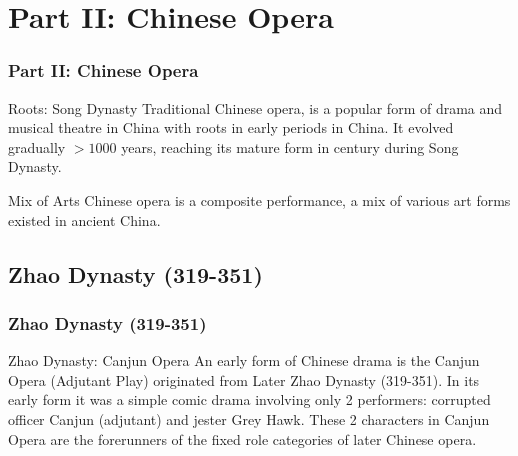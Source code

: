 \documentclass[pdflatex,compress,8pt,
	xcolor={dvipsnames,dvipsnames,svgnames,x11names,table},
	hyperref={	
	breaklinks = true, 
	pdfauthor={Lemenkova Polina}, 
	pdfsubject={Preentation}, 
	pdfcreator={Lemenkova Polina}, 
	pdfproducer={Lemenkova Polina}, 
	colorlinks=true,
	linkcolor=NavyBlue, 
	citecolor=NavyBlue, 
	urlcolor = NavyBlue, 
	breaklinks = true}]{beamer}
\begin{document}
\section{Part II: Chinese Opera}
\begin{frame}\frametitle{Part II: Chinese Opera}
	\small{
	\begin{block}{Roots: Song Dynasty}
	Traditional Chinese opera, is a popular form of drama and musical theatre in China with roots in early periods in China. It evolved gradually $>1000$ years, reaching its mature form in  century during Song Dynasty.
	\end{block}
	}
	
	\begin{figure}[H]
	\centering
			\hspace{1mm}
	\end{figure}

	\begin{alertblock}{Mix of Arts}
Chinese opera is a composite performance, a mix of various art forms existed in ancient China.
	\end{alertblock}

\end{frame}

\subsection{Zhao Dynasty (319-351)}
\begin{frame}\frametitle{Zhao Dynasty (319-351)}

	\begin{alertblock}{Zhao Dynasty: Canjun Opera}
An early form of Chinese drama is the Canjun Opera (Adjutant Play) originated from Later Zhao Dynasty (319-351). In its early form it was a simple comic drama involving only 2 performers: corrupted officer Canjun (adjutant) and jester Grey Hawk. These 2 characters in Canjun Opera are the forerunners of the fixed role categories of later Chinese opera.
	\end{alertblock}
	
\begin{figure}[H]
	\centering
			\hspace{1mm}
			\hspace{1mm}
\end{figure}
\end{frame}
\end{document}
